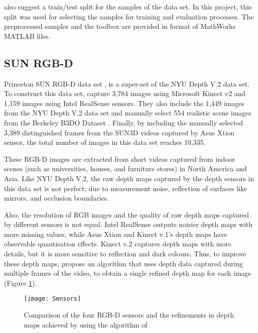 \citeauthor*{silberman} also suggest a train/test split for the samples of the data set. In this project, this split was used for selecting the samples for training and evaluation processes. The preprocessed samples and the toolbox are provided in format of MathWorks MATLAB files. 

\subsection{SUN RGB-D}

Princeton SUN RGB-D data set \cite{sun}, is a super-set of the NYU Depth V.2 \cite{silberman} data set. To construct this data set, \citeauthor*{sun} \cite{sun} capture 3,784 images using Microsoft Kinect v2 and 1,159 images using Intel RealSense sensors. They also include the 1,449 images from the NYU Depth V.2 data set and manually select 554 realistic scene images from the Berkeley B3DO Dataset \cite{b3do}. Finally, by including the manually selected 3,389 distinguished frames from the SUN3D \cite{sun3d} videos captured by Asus Xtion sensor, the total number of images in this data set reaches 10,335.

These RGB-D images are extracted from short videos captured from indoor scenes (such as universities, houses, and furniture stores) in North America and Asia. Like NYU Depth V.2, the raw depth maps captured by the depth sensors in this data set is not perfect; due to measurement noise, reflection of surfaces like mirrors, and occlusion boundaries. 

Also, the resolution of RGB images and the quality of raw depth maps captured by different sensors is not equal. Intel RealSense outputs noisier depth maps with more missing values, while Asus Xtion and Kinect v.1's depth maps have observable quantisation effects. Kinect v.2 captures depth maps with more details, but it is more sensitive to reflection and dark colours. Thus, to improve these depth maps, \citeauthor*{sun} propose an algorithm that uses depth data captured during multiple frames of the video, to obtain a single refined depth map for each image (Figure \ref{fig:sensors}). 

\begin{figure}
    \centering
    \texttt{[image: Sensors]}
    \caption{Comparison of the four RGB-D sensors and the refinements in depth maps achieved by using the algorithm of \citeauthor*{sun} \cite[p.~2]{sun}}
    \label{fig:sensors}
\end{figure}

